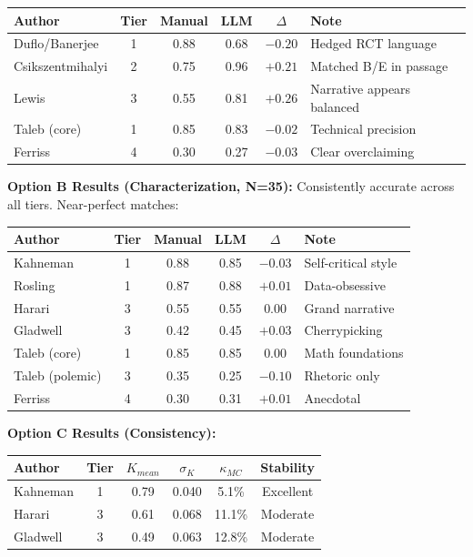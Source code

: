 \documentclass[11pt,a4paper]{article}
\begin{document}
\begin{table}[h]
\centering
\begin{tabular}{lccccl}
\toprule
\textbf{Author} & \textbf{Tier} & \textbf{Manual} & \textbf{LLM} & \textbf{$\Delta$} & \textbf{Note} \\
\midrule
Duflo/Banerjee & 1 & 0.88 & 0.68 & $-0.20$ & Hedged RCT language \\
Csikszentmihalyi & 2 & 0.75 & 0.96 & $+0.21$ & Matched B/E in passage \\
Lewis & 3 & 0.55 & 0.81 & $+0.26$ & Narrative appears balanced \\
Taleb (core) & 1 & 0.85 & 0.83 & $-0.02$ & Technical precision \\
Ferriss & 4 & 0.30 & 0.27 & $-0.03$ & Clear overclaiming \\
\bottomrule
\end{tabular}
\end{table}

\textbf{Option B Results (Characterization, N=35):} Consistently accurate across all tiers. Near-perfect matches:

\begin{table}[h]
\centering
\begin{tabular}{lccccl}
\toprule
\textbf{Author} & \textbf{Tier} & \textbf{Manual} & \textbf{LLM} & \textbf{$\Delta$} & \textbf{Note} \\
\midrule
Kahneman & 1 & 0.88 & 0.85 & $-0.03$ & Self-critical style \\
Rosling & 1 & 0.87 & 0.88 & $+0.01$ & Data-obsessive \\
Harari & 3 & 0.55 & 0.55 & $0.00$ & Grand narrative \\
Gladwell & 3 & 0.42 & 0.45 & $+0.03$ & Cherrypicking \\
Taleb (core) & 1 & 0.85 & 0.85 & $0.00$ & Math foundations \\
Taleb (polemic) & 3 & 0.35 & 0.25 & $-0.10$ & Rhetoric only \\
Ferriss & 4 & 0.30 & 0.31 & $+0.01$ & Anecdotal \\
\bottomrule
\end{tabular}
\end{table}

\textbf{Option C Results (Consistency):}
\begin{table}[h]
\centering
\begin{tabular}{lccccc}
\toprule
\textbf{Author} & \textbf{Tier} & \textbf{$K_{mean}$} & \textbf{$\sigma_K$} & \textbf{$\kappa_{MC}$} & \textbf{Stability} \\
\midrule
Kahneman & 1 & 0.79 & 0.040 & 5.1\% & Excellent \\
Harari & 3 & 0.61 & 0.068 & 11.1\% & Moderate \\
Gladwell & 3 & 0.49 & 0.063 & 12.8\% & Moderate \\
\bottomrule
\end{tabular}
\end{table}
\end{document}
